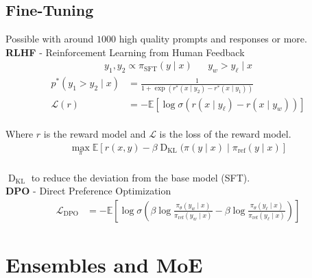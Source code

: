 \begin{multicols}{2}
\begin{mdframed}[style=eqbox]
        \subsection{Fine-Tuning}
        Possible with around $1000$ high quality prompts and responses or more.\\
        \textbf{RLHF} - Reinforcement Learning from Human Feedback
        \vspace{-6pt}
        \begin{align*}
            y_1,y_2 \propto \pi_{\mathrm{SFT}}(y \mid x) && y_w > y_\ell \mid x
        \end{align*}
        \vspace{-2.5em}
        \begin{align*}
            p^*(y_1 > y_2 \mid x) &= \frac{1}{1 + \exp(r^*(x \mid y_2) - r^*(x \mid y_1))}\\
            \mathcal{L}(r) &= - \mathbb{E} \left[\log\sigma (r(x \mid y_\ell) - r(x \mid y_w)) \right]
        \end{align*}\vspace{-16pt}\\
        {\tiny Where $r$ is the reward model and $\mathcal{L}$ is the loss of the reward model.}
        \begin{align*}
            \max_\pi \mathbb{E}\left[r(x,y) - \beta \operatorname{D}_\mathrm{KL} (\pi(y \mid x) \mid \pi_\mathrm{ref} (y \mid x)\right]
        \end{align*}\vspace{-16pt}\\
        {\tiny $\operatorname{D}_\mathrm{KL}$ to reduce the deviation from the base model (SFT).\\}
        \textbf{DPO} - Direct Preference Optimization
        \vspace{-6pt}
        \begin{align*}
            \mathcal{L}_\mathrm{DPO} &= - \mathbb{E} \left[ \log \sigma \left( \beta \log \frac{\pi_\theta (y_w \mid x)}{\pi_\mathrm{ref} (y_w \mid x)} - \beta \log \frac{\pi_\theta (y_\ell \mid x)}{\pi_\mathrm{ref} (y_\ell \mid x)} \right) \right]
        \end{align*}
    \end{mdframed}

    \section{Ensembles and MoE}
    \begin{mdframed}[style=eqbox]

\end{mdframed}
\end{multicols}

